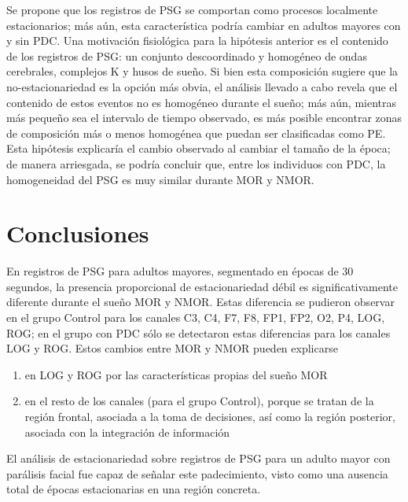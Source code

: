 Se propone que los registros de PSG se comportan como procesos localmente estacionarios; más 
aún, esta característica podría cambiar en adultos mayores con y sin PDC. 
Una motivación fisiológica para la hipótesis anterior es el contenido de los registros de
PSG: un conjunto descoordinado y homogéneo de ondas cerebrales, complejos K y husos de sueño.
Si bien esta composición sugiere que la no-estacionariedad es la opción más obvia, el
análisis llevado a cabo revela que el contenido de estos eventos no es homogéneo durante el
sueño; más aún, mientras más pequeño sea el intervalo de tiempo observado, es más
posible encontrar zonas de composición más o menos homogénea que puedan ser clasificadas
como PE.
Esta hipótesis explicaría el cambio observado al cambiar el tamaño de la época; de manera
arriesgada, se podría concluir que, entre los individuos con PDC, la homogeneidad del PSG es muy
similar durante MOR y NMOR.


\section{Conclusiones}

En registros de PSG para adultos mayores, segmentado en épocas de 30 segundos, la presencia 
proporcional de estacionariedad débil es significativamente diferente durante el sueño MOR y 
NMOR.
Estas diferencia se pudieron observar en el grupo Control para los canales C3, C4, F7, F8, FP1, 
FP2, O2, P4, LOG, ROG; en el grupo con PDC sólo se detectaron estas diferencias para los canales 
LOG y ROG.
Estos cambios entre MOR y NMOR pueden explicarse 
\begin{enumerate}
\item en LOG y ROG por las características propias  del sueño MOR
\item en el resto de los canales (para el grupo Control), porque se tratan de la 
región frontal, asociada a la toma de decisiones, así como la región posterior, 
asociada con la integración
de información
\end{enumerate}

El análisis de estacionariedad sobre registros de PSG para un adulto mayor con parálisis facial 
fue capaz de señalar este padecimiento, visto como una ausencia total de épocas estacionarias
en una región concreta.

